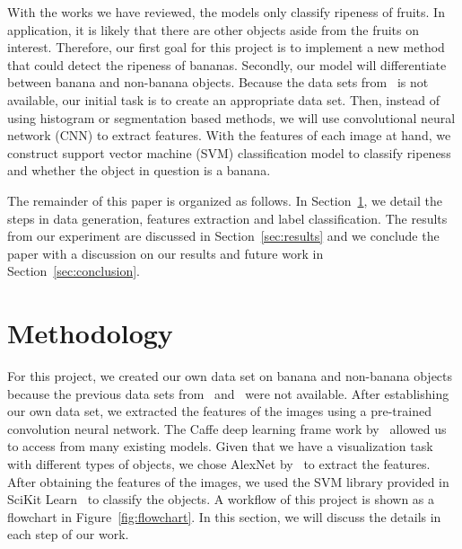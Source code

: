 \documentclass{article} %
\begin{document}
With the works we have reviewed, the models only classify ripeness of fruits. In application, it is likely that there are other objects aside from the fruits on interest. Therefore, our first goal for this project is to implement a new method that could detect the ripeness of bananas. Secondly, our model will differentiate between banana and non-banana objects. Because the data sets from~\citet{paulraj2009color} is not available, our initial task is to create an appropriate data set. Then, instead of using histogram or segmentation based methods, we will use convolutional neural network (CNN) to extract features. With the features of each image at hand, we construct support vector machine (SVM) classification model to classify ripeness and whether the object in question is a banana. 

The remainder of this paper is organized as follows. In Section~\ref{sec:method}, we detail the steps in data generation, features extraction and label classification. The results from our experiment are discussed in Section~\ref{sec:results} and we conclude the paper with a discussion on our results and future work in Section~\ref{sec:conclusion}. 

\section{Methodology}
\label{sec:method}
For this project, we created our own data set on banana and non-banana objects because the previous data sets from~\citet{saad2009recognizing} and~\citet{paulraj2009color} were not available. After establishing our own data set, we extracted the features of the images using a pre-trained convolution neural network. The Caffe deep learning frame work by~\citet{jia2014caffe} allowed us to access from many existing models. Given that we have a visualization task with different types of objects, we chose AlexNet by~\citet{krizhevsky2012imagenet} to extract the features. After obtaining the features of the images, we used the SVM library provided in SciKit Learn~\citep{scikit-learn} to classify the objects. A workflow of this project is shown as a flowchart in Figure~\ref{fig:flowchart}. In this section, we will discuss the details in each step of our work. 
\end{document}
